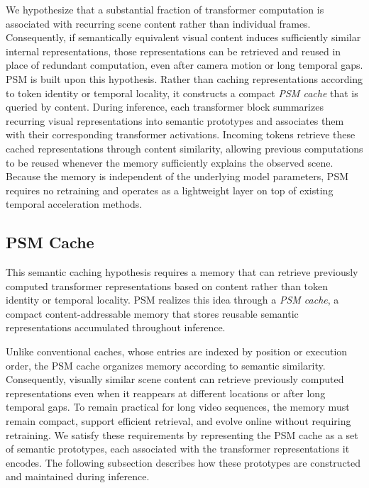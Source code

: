 \documentclass[letterpaper]{article}
\begin{document}
We hypothesize that a substantial fraction of transformer computation is
associated with recurring scene content rather than individual frames.
Consequently, if semantically equivalent visual content induces
sufficiently similar internal representations, those representations can
be retrieved and reused in place of redundant computation, even after
camera motion or long temporal gaps.
%
PSM is built upon this hypothesis. Rather than caching
representations according to token identity or temporal locality, it
constructs a compact \emph{PSM cache} that is queried
by content. During inference, each transformer block summarizes recurring
visual representations into semantic prototypes and associates them with
their corresponding transformer activations. Incoming tokens retrieve
these cached representations through content similarity, allowing
previous computations to be reused whenever the memory sufficiently
explains the observed scene. Because the memory is independent of the
underlying model parameters, PSM requires no retraining and operates
as a lightweight layer on top of existing temporal acceleration
methods.
 
 
\subsection{PSM Cache}
 
This semantic caching hypothesis requires a memory that can retrieve previously computed transformer representations based on content rather than token identity or temporal locality. PSM realizes this idea through a \emph{PSM cache}, a compact content-addressable memory that stores reusable semantic representations accumulated throughout
inference.
 
Unlike conventional caches, whose entries are indexed by position or
execution order, the PSM cache organizes memory according to semantic similarity.
Consequently, visually similar scene content can retrieve previously
computed representations even when it reappears at different locations or
after long temporal gaps. To remain practical for long video sequences,
the memory must remain compact, support efficient retrieval, and evolve
online without requiring retraining.
%
We satisfy these requirements by representing the PSM cache as a set of semantic
prototypes, each associated with the transformer representations it
encodes. The following subsection describes how these prototypes are
constructed and maintained during inference.
 
\end{document}
